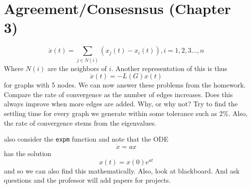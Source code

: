 \documentclass{article}
\begin{document}
\section*{Agreement/Consesnsus (Chapter 3)}
\[ \dot{x}(t) = \sum_{j \in N(i)} \left( x_j(t) - x_i(t) \right),
i=1,2,3\ldots,n \]
Where $N(i)$ are the neighbors of $i$. Another representation of this is thus
\[ \dot{x}(t) = -L(G)x(t) \]
for graphs with 5 nodes.
We can now answer these problems from the homework. Compare the rate of
convergence as the number of edges increases. Does this always improve when more
edges are added. Why, or why not? Try to find the settling time for every graph
we generate within some tolerance such as 2\%. Also, the rate of convergence
stems from the eigenvalues. 

also consider the \texttt{expm} function and note that the ODE
\[ \dot{x} = a x \]
has the solution
\[ x(t) = x(0) e^{at} \]
and so we can also find this mathematically. Also, look at blackboard. And ask
questions and the professor will add papers for projects.
\end{document}
